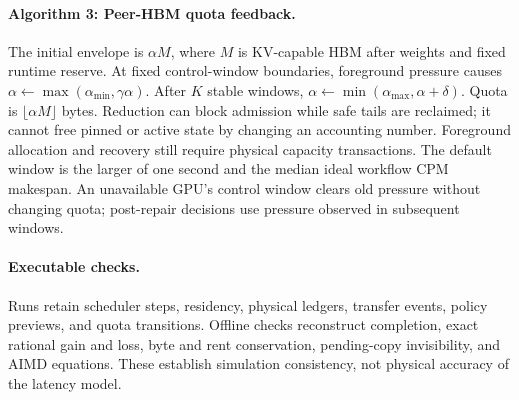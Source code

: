 \paragraph{Algorithm 3: Peer-HBM quota feedback.}
The initial envelope is $\alpha M$, where $M$ is KV-capable HBM after weights
and fixed runtime reserve. At fixed control-window boundaries, foreground
pressure causes $\alpha\leftarrow\max(\alpha_{\min},\gamma\alpha)$.
After $K$ stable windows,
$\alpha\leftarrow\min(\alpha_{\max},\alpha+\delta)$.
Quota is $\lfloor\alpha M\rfloor$ bytes. Reduction can block admission while
safe tails are reclaimed; it cannot free pinned or active state by changing
an accounting number. Foreground allocation and recovery still require
physical capacity transactions. The default window is the larger of one
second and the median ideal workflow CPM makespan.
An unavailable GPU's control window clears old pressure without changing
quota; post-repair decisions use pressure observed in subsequent windows.

\paragraph{Executable checks.}
Runs retain scheduler steps, residency, physical ledgers, transfer events,
policy previews, and quota transitions. Offline checks reconstruct completion,
exact rational gain and loss, byte and rent conservation, pending-copy
invisibility, and AIMD equations. These establish simulation consistency,
not physical accuracy of the latency model.
